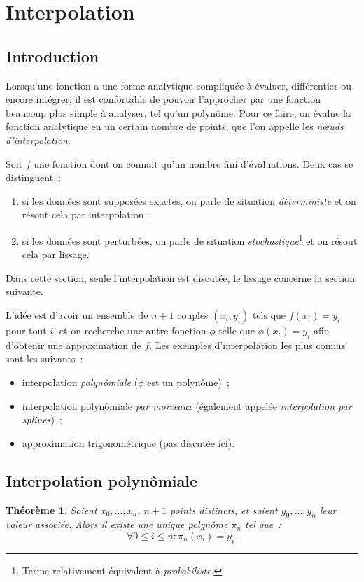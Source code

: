\documentclass{article}
\newtheorem{thm}{Théorème}[section]
\theoremstyle{definition}
\theoremstyle{remark}
\begin{document}
\newpage
\section{Interpolation}
	\subsection*{Introduction}
		Lorsqu'une fonction a une forme analytique compliquée à évaluer, différentier ou encore intégrer, il est confortable de pouvoir l'approcher par une
		fonction beaucoup plus simple à analyser, tel qu'un polynôme. Pour ce faire, on évalue la fonction analytique en un certain nombre de points, que
		l'on appelle les \emph{nœuds d'interpolation}.

		Soit $f$ une fonction dont on connait qu'un nombre fini d'évaluations. Deux cas se distinguent~:
		\begin{enumerate}
			\item si les données sont supposées exactes, on parle de situation \emph{déterministe} et on résout cela par interpolation~;
			\item si les données sont perturbées, on parle de situation \emph{stochastique}\footnote{Terme relativement équivalent à \emph{probabiliste}.}
			    et on résout cela par lissage.
		\end{enumerate}

		Dans cette section, seule l'interpolation est discutée, le lissage concerne la section suivante.

		L'idée est d'avoir un ensemble de $n+1$ couples $(x_i, y_i)$ tels que $f(x_i) = y_i$ pour tout $i$, et on recherche une autre fonction $\phi$ telle
		que $\phi(x_i) = y_i$ afin d'obtenir une approximation de $f$. Les exemples d'interpolation les plus connus sont les suivants~:
		\begin{itemize}
			\item interpolation \emph{polynômiale} ($\phi$ est un polynôme)~;
			\item interpolation polynômiale \emph{par morceaux} (également appelée \emph{interpolation par splines})~;
			\item approximation trigonométrique (pas discutée ici).
		\end{itemize}

	\subsection{Interpolation polynômiale}
		\begin{thm}\label{thm:caractérisationpolynômeparpoints} Soient $x_0, \dotsc, x_n$, $n+1$ points distincts, et soient $y_0, \dotsc, y_n$ leur valeur
		associée. Alors il existe une unique polynôme $\pi_n$ tel que~:
		\[\forall 0 \leq i \leq n : \pi_n(x_i) = y_i.\]
		\end{thm}
\end{document}
